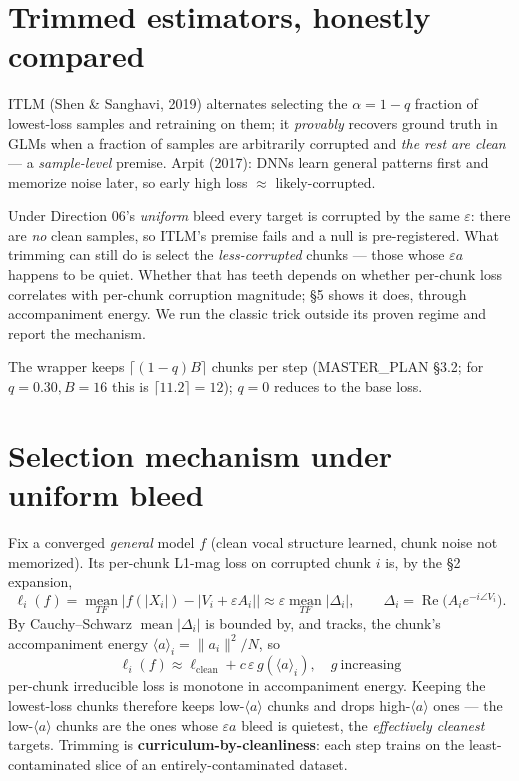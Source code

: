 \documentclass[11pt]{article}
\DeclareMathOperator{\Rea}{Re}
\newcommand{\eps}{\varepsilon}
\newcommand{\norm}[1]{\lVert #1 \rVert}
\begin{document}
\section{Trimmed estimators, honestly compared}

ITLM (Shen \& Sanghavi, 2019) alternates selecting the $\alpha=1-q$ fraction of lowest-loss
samples and retraining on them; it \emph{provably} recovers ground truth in GLMs when a
fraction of samples are arbitrarily corrupted and \emph{the rest are clean} --- a
\emph{sample-level} premise. Arpit (2017): DNNs learn general patterns first and memorize
noise later, so early high loss $\approx$ likely-corrupted.

Under Direction 06's \emph{uniform} bleed every target is corrupted by the same $\eps$:
there are \emph{no} clean samples, so ITLM's premise fails and a null is pre-registered.
What trimming can still do is select the \emph{less-corrupted} chunks --- those whose
$\eps a$ happens to be quiet. Whether that has teeth depends on whether per-chunk loss
correlates with per-chunk corruption magnitude; \S5 shows it does, through accompaniment
energy. We run the classic trick outside its proven regime and report the mechanism.

The wrapper keeps $\lceil(1-q)B\rceil$ chunks per step (MASTER\_PLAN \S3.2; for $q=0.30,
B=16$ this is $\lceil11.2\rceil=12$); $q=0$ reduces to the base loss.

\section{Selection mechanism under uniform bleed}

Fix a converged \emph{general} model $f$ (clean vocal structure learned, chunk noise not
memorized). Its per-chunk L1-mag loss on corrupted chunk $i$ is, by the \S2 expansion,
\begin{equation}
\ell_i(f)=\operatorname*{mean}_{TF}\big|f(|X_i|)-|V_i+\eps A_i|\big|
   \approx\eps\operatorname*{mean}_{TF}|\Delta_i|,
\qquad \Delta_i=\Rea\!\big(A_i e^{-i\angle V_i}\big).
\end{equation}
By Cauchy--Schwarz $\operatorname{mean}|\Delta_i|$ is bounded by, and tracks, the chunk's
accompaniment energy $\langle a\rangle_i=\norm{a_i}^2/N$, so
\begin{equation}
\boxed{\ \ell_i(f)\approx\ell_{\text{clean}}+c\,\eps\,g(\langle a\rangle_i),\quad g\
\text{increasing}\ }
\end{equation}
per-chunk irreducible loss is monotone in accompaniment energy. Keeping the lowest-loss
chunks therefore keeps low-$\langle a\rangle$ chunks and drops high-$\langle a\rangle$ ones
--- the low-$\langle a\rangle$ chunks are the ones whose $\eps a$ bleed is quietest, the
\emph{effectively cleanest} targets. Trimming is \textbf{curriculum-by-cleanliness}: each
step trains on the least-contaminated slice of an entirely-contaminated dataset.
\end{document}
